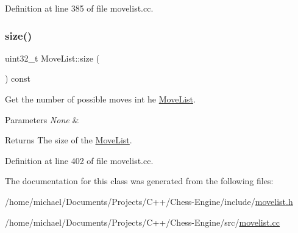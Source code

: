 Definition at line 385 of file movelist.\+cc.

\mbox{\label{classMoveList_a4975d53e1bca9fde5bbc9d02242f18e7}} 
\subsubsection{\texorpdfstring{size()}{size()}}
{\footnotesize\ttfamily uint32\+\_\+t Move\+List\+::size (\begin{DoxyParamCaption}{ }\end{DoxyParamCaption}) const\hspace{0.3cm}{\ttfamily [noexcept]}}



Get the number of possible moves int he \mbox{\hyperlink{classMoveList}{Move\+List}}. 


\begin{DoxyParams}{Parameters}
{\em None} & \\
\hline
\end{DoxyParams}
\begin{DoxyReturn}{Returns}
The size of the \mbox{\hyperlink{classMoveList}{Move\+List}}. 
\end{DoxyReturn}


Definition at line 402 of file movelist.\+cc.



The documentation for this class was generated from the following files\+:\begin{DoxyCompactItemize}
\item 
/home/michael/\+Documents/\+Projects/\+C++/\+Chess-\/\+Engine/include/\mbox{\hyperlink{movelist_8h}{movelist.\+h}}\item 
/home/michael/\+Documents/\+Projects/\+C++/\+Chess-\/\+Engine/src/\mbox{\hyperlink{movelist_8cc}{movelist.\+cc}}\end{DoxyCompactItemize}
